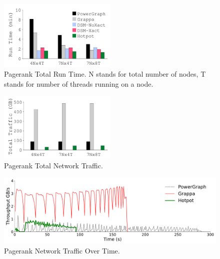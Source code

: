 {
\begin{figure}[t]
\begin{center}
\centerline{\includegraphics[width=0.5\textwidth]{hotpot/Figures/g_plot_graph_ATC_runtime.pdf}}
\caption[Pagerank Total Run Time.]
{
Pagerank Total Run Time.
N stands for total number of nodes, T stands for number of threads running on a node.
}
\label{fig-graph-runtime}
\end{center}
\end{figure}
}
{
\begin{figure}[t]
\begin{center}
\centerline{\includegraphics[width=0.5\textwidth]{hotpot/Figures/g_plot_graph_ATC_network.pdf}}
\caption[Pagerank Total Network Traffic.]
{
Pagerank Total Network Traffic.
}
\label{fig-graph-traffic}
\end{center}
\end{figure}
}
{
\begin{figure}[t]
\begin{center}
\centerline{\includegraphics[width=\textwidth]{hotpot/Figures/g_plot_combined_trace_timewindow.pdf}}
\caption[Pagerank Network Traffic Over Time.]{Pagerank Network Traffic Over Time.}
\label{fig-graph-timeline}
\end{center}
\end{figure}
}
